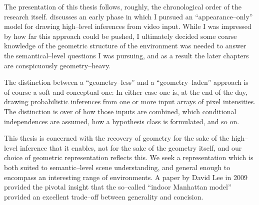The presentation of this thesis follows, roughly, the chronological
order of the research itself.  discusses an
early phase in which I pursued an ``appearance--only'' model for
drawing high--level inferences from video input. While I was impressed
by how far this approach could be pushed, I ultimately decided some
coarse knowledge of the geometric structure of the environment was
needed to answer the semantical--level questions I was pursuing, and
as a result the later chapters are conspicuously geometry--heavy.

The distinction between a ``geometry--less'' and a ``geometry--laden''
approach is of course a soft and conceptual one: In either case one
is, at the end of the day, drawing probabilistic inferences from one
or more input arrays of pixel intensities. The distinction is over of
how those inputs are combined, which conditional independences are
assumed, how a hypothesis class is formulated, and so on.

This thesis is concerned with the recovery of geometry for the sake of
the high--level inference that it enables, not for the sake of the
geometry itself, and our choice of geometric representation reflects
this. We seek a representation which is both suited to semantic--level
scene understanding, and general enough to encompass an interesting
range of environments. A paper by David Lee \cite{Lee09} in 2009
provided the pivotal insight that the so--called ``indoor Manhattan
model'' provided an excellent trade--off between generality and
concision.

